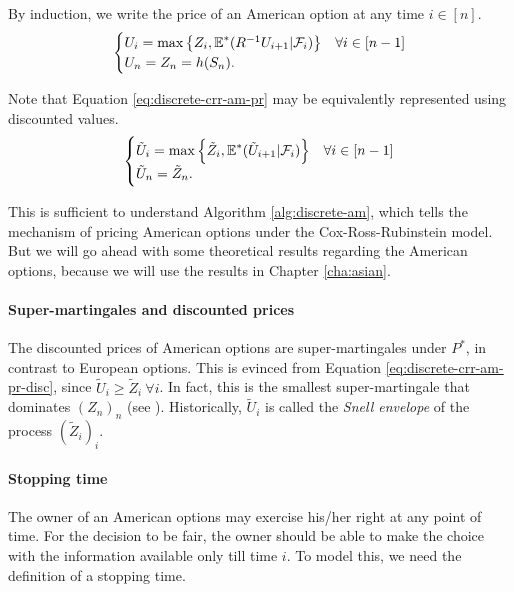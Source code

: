 By induction, we write the price of an American option at any time $ i \in [n] $.
\begin{equation}
	\label{eq:discrete-crr-am-pr}
	\begin{cases}
		U_i = \max \left\lbrace Z_i, \operatorname{\mathbb{E}}^*( R^{-1} U_{i+1} | \mathcal{F}_{i} ) \right\rbrace  &  \forall i \in [n-1]  \\
		U_n = Z_n = h(S_n) .
	\end{cases}
\end{equation}

Note that Equation \ref{eq:discrete-crr-am-pr} may be equivalently represented using discounted values.
\begin{equation}
	\label{eq:discrete-crr-am-pr-disc}
	\begin{cases}
		\tilde{U}_i = \max \left\lbrace \tilde{Z}_i, \operatorname{\mathbb{E}}^*( \tilde{U}_{i+1} | \mathcal{F}_{i} ) \right\rbrace  &  \forall i \in [n-1]  \\
		\tilde{U}_n = \tilde{Z}_n .
	\end{cases}
\end{equation}

This is sufficient to understand Algorithm \ref{alg:discrete-am}, which tells the mechanism of pricing American options under the Cox-Ross-Rubinstein model. But we will go ahead with some theoretical results regarding the American options, because we will use the results in Chapter \ref{cha:asian}.


\paragraph{Super-martingales and discounted prices}
The discounted prices of American options are super-martingales under $ P^* $, in contrast to European options. This is evinced from Equation \ref{eq:discrete-crr-am-pr-disc}, since $ \tilde{U}_i \ge \tilde{Z}_i \  \forall i $.
In fact, this is the smallest super-martingale that dominates $ (Z_n)_n $ (see \cite[Proposition 1.3.6]{Lamberton1996}). Historically, $ \tilde{U}_i $ is called the \emph{Snell envelope} of the process $ (\tilde{Z}_i)_i $.


\paragraph{Stopping time}
The owner of an American options may exercise his/her right at any point of time. For the decision to be fair, the owner should be able to make the choice with the information available only till time $ i $. To model this, we need the definition of a stopping time.

